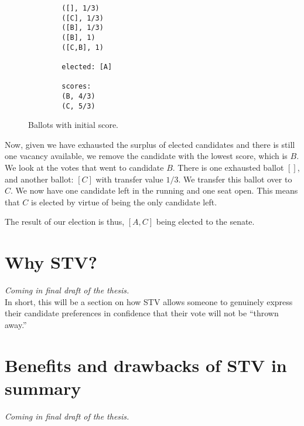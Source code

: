 \begin{figure}[ht!!!!!!!!]
    \caption{Ballots with initial score.}
    \label{sample_election3}
    \begin{lstlisting}
        ([], 1/3)
        ([C], 1/3)
        ([B], 1/3)
        ([B], 1)
        ([C,B], 1)

        elected: [A]

        scores: 
        (B, 4/3)
        (C, 5/3)
    \end{lstlisting}
\end{figure}

Now, given we have exhausted the surplus of elected candidates and there is
still one vacancy available, we remove the candidate with the lowest score,
which is $B$. We look at the votes that went to candidate $B$. There is one
exhausted ballot $[]$, and another ballot: $[C]$ with transfer value $1/3$. We
transfer this ballot over to $C$. We now have one candidate left in the running
and one seat open. This means that $C$ is elected by virtue of being the only
candidate left. 

The result of our election is thus, $[A,C]$ being elected to the senate.  

\section{Why STV?}
\textit{Coming in final draft of the thesis.} \\
In short, this will be a section on how STV allows someone to genuinely express
their candidate preferences in confidence that their vote will not be ``thrown
away.''

\section{Benefits and drawbacks of STV in summary}
\textit{Coming in final draft of the thesis.}



